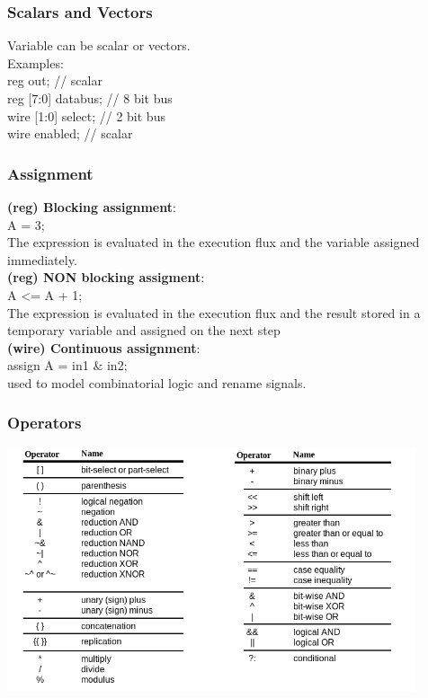 \documentclass{beamer}
\begin{document}
\begin{frame}\frametitle{Scalars and Vectors}
Variable can be scalar or vectors. \\
\vspace{0.3cm}
Examples: \\
reg out; // scalar \\
reg [7:0] databus; // 8 bit bus \\
wire [1:0] select; // 2 bit bus \\
wire enabled; // scalar
\end{frame}
 	
\begin{frame}\frametitle{Assignment}
	\textbf{(reg) Blocking assignment}: \\
	A = 3; \\
	The expression is evaluated in the execution flux and the variable assigned immediately. \\
	\pause
	\vspace{0.3cm}
	\textbf{(reg) NON blocking assigment}: \\
	A \textless= A + 1; \\
	The expression is evaluated in the execution flux and the result stored in a temporary variable and assigned on the next step \\
	\pause
	\vspace{0.3cm}
	\textbf{(wire) Continuous assignment}: \\
	assign A = in1 \& in2; \\
	used to model combinatorial logic and rename signals.
	
\end{frame}	

\begin{frame}\frametitle{Operators}
\begin{center}
\includegraphics[width=0.9\textwidth]{operatori.jpg}
\end{center}
\end{frame}
\end{document}
